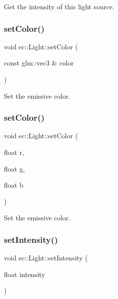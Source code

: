 Get the intensity of this light source. \mbox{\label{classec_1_1_light_ab3a3ade92e06121c965216fb168ef5db}} 
\subsubsection{\texorpdfstring{set\+Color()}{setColor()}\hspace{0.1cm}{\footnotesize\ttfamily [1/2]}}
{\footnotesize\ttfamily void ec\+::\+Light\+::set\+Color (\begin{DoxyParamCaption}\item[{const glm\+::vec3 \&}]{color }\end{DoxyParamCaption})}

Set the emissive color. \mbox{\label{classec_1_1_light_aaa6d6edfe31b15dc259a8fa0d59ef8de}} 
\subsubsection{\texorpdfstring{set\+Color()}{setColor()}\hspace{0.1cm}{\footnotesize\ttfamily [2/2]}}
{\footnotesize\ttfamily void ec\+::\+Light\+::set\+Color (\begin{DoxyParamCaption}\item[{float}]{r,  }\item[{float}]{g,  }\item[{float}]{b }\end{DoxyParamCaption})}

Set the emissive color. \mbox{\label{classec_1_1_light_ae2b2bbbc88aef9d531627bb90f7b0183}} 
\subsubsection{\texorpdfstring{set\+Intensity()}{setIntensity()}}
{\footnotesize\ttfamily void ec\+::\+Light\+::set\+Intensity (\begin{DoxyParamCaption}\item[{float}]{intensity }\end{DoxyParamCaption})}

